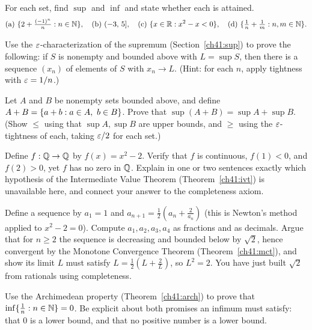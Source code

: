 \begin{exercise}
\label{ch41:ex-sup-inf}
For each set, find $\sup$ and $\inf$ and state whether each is attained.
\[
\text{(a) } \{2 + \tfrac{(-1)^n}{n} : n\in\mathbb{N}\}, \quad
\text{(b) } (-3,\,5], \quad
\text{(c) } \{x\in\mathbb{R} : x^2 - x < 0\}, \quad
\text{(d) } \{\tfrac{1}{n}+\tfrac{1}{m} : n,m\in\mathbb{N}\}.
\]
\end{exercise}

\begin{exercise}
\label{ch41:ex-eps-char}
Use the $\varepsilon$-characterization of the supremum (Section~\ref{ch41:sup}) to prove the
following: if $S$ is nonempty and bounded above with $L=\sup S$, then there is a sequence
$(x_n)$ of elements of $S$ with $x_n \to L$. (Hint: for each $n$, apply tightness with
$\varepsilon = 1/n$.)
\end{exercise}

\begin{exercise}
\label{ch41:ex-sup-sum}
Let $A$ and $B$ be nonempty sets bounded above, and define
$A+B = \{a+b : a\in A,\ b\in B\}$. Prove that $\sup(A+B) = \sup A + \sup B$. (Show
$\le$ using that $\sup A,\sup B$ are upper bounds, and $\ge$ using the $\varepsilon$-tightness of
each, taking $\varepsilon/2$ for each set.)
\end{exercise}

\begin{exercise}
\label{ch41:ex-ivt-rational}
Define $f:\mathbb{Q}\to\mathbb{Q}$ by $f(x)=x^2-2$. Verify that $f$ is continuous, $f(1)<0$, and $f(2)>0$,
yet $f$ has no zero in $\mathbb{Q}$. Explain in one or two sentences exactly which hypothesis of the
Intermediate Value Theorem (Theorem~\ref{ch41:ivt}) is unavailable here, and connect your
answer to the completeness axiom.
\end{exercise}

\begin{exercise}
\label{ch41:ex-monotone}
Define a sequence by $a_1 = 1$ and $a_{n+1} = \tfrac12\!\left(a_n + \tfrac{2}{a_n}\right)$
(this is Newton's method applied to $x^2-2=0$). Compute $a_1,a_2,a_3,a_4$ as fractions and
as decimals. Argue that for $n\ge 2$ the sequence is decreasing and bounded below by
$\sqrt2$, hence convergent by the Monotone Convergence Theorem
(Theorem~\ref{ch41:mct}), and show its limit $L$ must satisfy $L=\tfrac12(L+\tfrac2L)$, so
$L^2=2$. You have just built $\sqrt2$ from rationals using completeness.
\end{exercise}

\begin{exercise}
\label{ch41:ex-archimedean}
Use the Archimedean property (Theorem~\ref{ch41:arch}) to prove that
$\inf\{\tfrac1n : n\in\mathbb{N}\} = 0$. Be explicit about both promises an infimum must
satisfy: that $0$ is a lower bound, and that no positive number is a lower bound.
\end{exercise}

